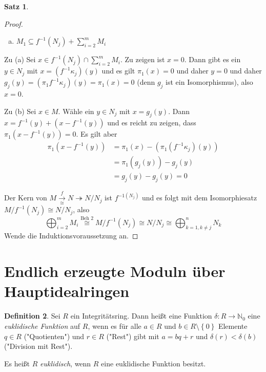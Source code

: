 \documentclass[
twoside=semi,
fontsize=12,
DIV=12, 
cleardoublepage=current,
leqno,
headings=optiontoheadandtoc, 
toc=idx
]{scrbook}
\newcommand{\N}{\mathbb{N}}
\newcommand{\set}[1]{\left\{ #1 \right\}}
\theoremstyle{definition}
\newtheorem{definition}{Definition}[section]
\newtheorem{satz}[definition]{Satz}
\begin{document}
\begin{satz}
\begin{proof}
\begin{enumerate}[(a)]
				\item $M_1 \subseteq f^{-1}(N_j) + \sum_{i=2}^mM_i$
			\end{enumerate}
		
			Zu (a) Sei $x \in f^{-1}(N_j) \cap \sum_{i=2}^mM_i$. Zu zeigen ist $x = 0$. Dann gibt es ein $y \in N_j$ mit $x = (f^{-1}\kappa_j)(y)$ und es gilt $\pi_1(x) = 0$ und daher $y = 0$ und daher $g_j(y) = (\pi_1f^{-1}\kappa_j)(y) = \pi_1(x) = 0$ (denn $g_j$ ist ein Isomorphismus), also $x = 0$.
			
			Zu (b) Sei $x \in M$. W\"ahle ein $y\in N_j$ mit $x = g_j(y)$. Dann $x = f^{-1}(y) + (x - f^{-1}(y))$ und es reicht zu zeigen, dass $\pi_1(x-f^{-1}(y)) = 0$. Es gilt aber 
			\begin{align*}
				\pi_1(x-f^{-1}(y))&=\pi_1(x) - (\pi_1(f^{-1}\kappa_j)(y))\\
				&= \pi_1(g_j(y)) - g_j(y) \\
				&= g_j(y) - g_j(y) = 0
			\end{align*}
		
			Der Kern von $M \xrightarrow[\cong]{f} N \twoheadrightarrow N/N_j$ ist $f^{-1(N_j)}$ und es folgt mit dem Isomorphiesatz $M/f^{-1}(N_j) \cong N/N_j$, also
				\[\bigoplus_{i=2}^mM_i \overset{\textrm{Beh 2}}{\cong} M/f^{-1}(N_j) \cong N/N_j \cong \bigoplus_{k=1, k \neq j}^n N_k\]
			Wende die Induktionsvoraussetzung an.
		\end{proof}
	\end{satz}

	\newpage
	\section{Endlich erzeugte Moduln \"uber Hauptidealringen}
	
	\begin{definition}\label{1.6.1}
		Sei $R$ ein Integrit\"atsring. Dann hei\ss t eine Funktion $\delta:R \to \N_0$ eine \emph{euklidische Funktion} auf $R$, wenn es f\"ur alle $a \in R$ und $b \in R\setminus \set{0}$ Elemente $q \in R$ ("Quotienten") und $r \in R$ ("Rest") gibt mit $a = bq + r$ und $\delta(r) < \delta(b)$ ("Division mit Rest").
		
		Es hei\ss t $R$ \emph{euklidisch}, wenn $R$ eine euklidische Funktion besitzt.
	\end{definition}
\end{document}
